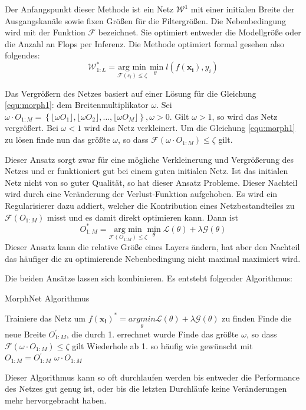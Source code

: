 Der Anfangspunkt dieser Methode ist ein Netz $\mathcal{W}^1$ mit einer initialen Breite der Ausgangskanäle sowie fixen Größen für die Filtergrößen. Die Nebenbedingung wird mit der Funktion $\mathcal{F}$ bezeichnet. Sie optimiert entweder die Modellgröße oder die Anzahl an Flops per Inferenz. Die Methode optimiert formal gesehen also folgendes:
\begin{equation}
 \mathcal{W}^{\ast}_{1:L}= \underset{\mathcal{F}(c_l)\leq \zeta}{\text{arg min}} \underset{\theta}{\text{ min}}\; l(f(\mathbf{x_i}),y_i)\label{equ:morph1}
\end{equation}

Das Vergrößern des Netzes basiert auf einer Lösung für die Gleichung \ref{equ:morph1}: dem Breitenmultiplikator $\omega$. 
Sei $\omega \cdot O_{1:M} = \left\{ \lfloor \omega O_1 \rfloor, \lfloor \omega O_2 \rfloor, \ldots , \lfloor \omega O_M \rfloor \right\}, \omega>0$. Gilt $\omega>1$, so wird das Netz vergrößert. Bei $\omega <1$ wird das Netz verkleinert. Um die Gleichung \ref{equ:morph1} zu lösen finde nun das größte $\omega$, so dass $\mathcal{F}(\omega \cdot O_{1:M})\leq \zeta$ gilt.


Dieser Ansatz sorgt zwar für eine mögliche Verkleinerung und Vergrößerung des Netzes und er funktioniert gut bei einem guten initialen Netz. Ist das initialen Netz nicht von so guter Qualität, so hat dieser Ansatz Probleme. 
Dieser Nachteil wird durch eine Veränderung der Verlust-Funktion aufgehoben. Es wird ein Regularisierer dazu addiert, welcher die Kontribution eines Netzbestandteiles zu $\mathcal{F}( O_{1:M})$ misst und es damit direkt optimieren kann. Dann ist
\begin{equation}
 O^{\ast}_{1:M}= \underset{\mathcal{F}(O_{1:M})\leq \zeta}{\text{arg min}} \underset{\theta}{\text{min}}\; \mathcal{L}(\theta) + \lambda \mathcal{G}(\theta)  
 \label{equ:morph2}
\end{equation}
Dieser Ansatz kann die relative Größe eines Layers ändern, hat aber den Nachteil das häufiger die zu optimierende Nebenbedingung nicht maximal maximiert wird.




Die beiden Ansätze lassen sich kombinieren. Es entsteht folgender Algorithmus:
\begin{algorithm}[H]
\caption{MorphNet Algorithmus}
\begin{algorithmic}[1]
\STATE Trainiere das Netz um $f(\mathbf{x_i})^{\ast}=\underset{\theta}{arg min} \mathcal{L}(\theta) + \lambda \mathcal{G}(\theta)$ zu finden
\STATE Finde die neue Breite $O_{1:M}^{\prime}$, die durch 1. errechnet wurde
\STATE Finde das größte $\omega$, so dass $\mathcal{F}(\omega \cdot O_{1:M})\leq \zeta$ gilt
\STATE Wiederhole ab 1. so häufig wie gewünscht mit $O_{1:M} = O_{1:M}^{\prime}$
\ENSURE $\omega \cdot O_{1:M}$
\end{algorithmic}
\label{alg:morphnet}
\end{algorithm}
Dieser Algorithmus kann so oft durchlaufen werden bis entweder die Performance des Netzes gut genug ist, oder bis die letzten Durchläufe keine Veränderungen mehr hervorgebracht haben.


